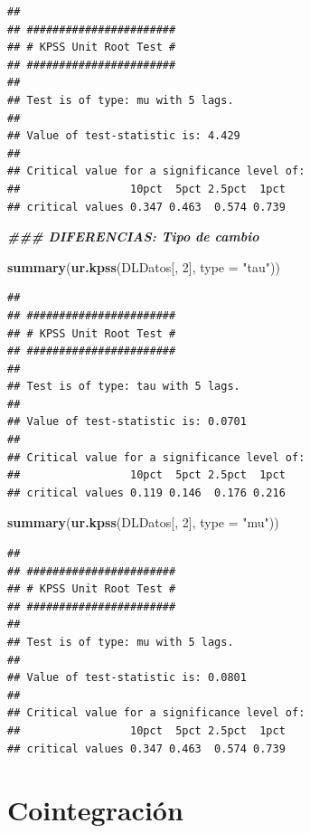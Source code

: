 \documentclass[
]{book}
\newenvironment{Shaded}{\begin{snugshade}}{\end{snugshade}}
\newcommand{\AttributeTok}[1]{\textcolor[rgb]{0.13,0.29,0.53}{#1}}
\newcommand{\DecValTok}[1]{\textcolor[rgb]{0.00,0.00,0.81}{#1}}
\newcommand{\DocumentationTok}[1]{\textcolor[rgb]{0.56,0.35,0.01}{\textbf{\textit{#1}}}}
\newcommand{\FunctionTok}[1]{\textcolor[rgb]{0.13,0.29,0.53}{\textbf{#1}}}
\newcommand{\NormalTok}[1]{#1}
\newcommand{\StringTok}[1]{\textcolor[rgb]{0.31,0.60,0.02}{#1}}
\begin{document}
\begin{verbatim}
## 
## ####################### 
## # KPSS Unit Root Test # 
## ####################### 
## 
## Test is of type: mu with 5 lags. 
## 
## Value of test-statistic is: 4.429 
## 
## Critical value for a significance level of: 
##                 10pct  5pct 2.5pct  1pct
## critical values 0.347 0.463  0.574 0.739
\end{verbatim}

\begin{Shaded}
\begin{Highlighting}[]
\DocumentationTok{\#\#\# DIFERENCIAS: Tipo de cambio}

\FunctionTok{summary}\NormalTok{(}\FunctionTok{ur.kpss}\NormalTok{(DLDatos[, }\DecValTok{2}\NormalTok{], }\AttributeTok{type =} \StringTok{"tau"}\NormalTok{))}
\end{Highlighting}
\end{Shaded}

\begin{verbatim}
## 
## ####################### 
## # KPSS Unit Root Test # 
## ####################### 
## 
## Test is of type: tau with 5 lags. 
## 
## Value of test-statistic is: 0.0701 
## 
## Critical value for a significance level of: 
##                 10pct  5pct 2.5pct  1pct
## critical values 0.119 0.146  0.176 0.216
\end{verbatim}

\begin{Shaded}
\begin{Highlighting}[]
\FunctionTok{summary}\NormalTok{(}\FunctionTok{ur.kpss}\NormalTok{(DLDatos[, }\DecValTok{2}\NormalTok{], }\AttributeTok{type =} \StringTok{"mu"}\NormalTok{))}
\end{Highlighting}
\end{Shaded}

\begin{verbatim}
## 
## ####################### 
## # KPSS Unit Root Test # 
## ####################### 
## 
## Test is of type: mu with 5 lags. 
## 
## Value of test-statistic is: 0.0801 
## 
## Critical value for a significance level of: 
##                 10pct  5pct 2.5pct  1pct
## critical values 0.347 0.463  0.574 0.739
\end{verbatim}

\hypertarget{cointegraciuxf3n}{%
\chapter{Cointegración}\label{cointegraciuxf3n}}
\end{document}
